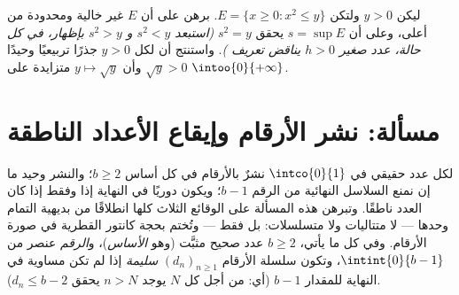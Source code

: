 \begin{exercise}[$\star\star\star$]\label{exo:b1:reals:12}
ليكن $y > 0$ ولتكن $E = \{x \geq 0 : x^2 \leq y\}$. برهن على أن $E$
غير خالية ومحدودة من أعلى، وعلى أن $s = \sup E$ يحقق $s^2 =
y$ \emph{(استبعد $s^2 < y$ و $s^2 > y$ بإظهار، في كل
حالة، عدد صغير $h > 0$ يناقض تعريف
)}. واستنتج أن لكل $y > 0$ جذرًا تربيعيًا وحيدًا
$\sqrt y > 0$ وأن $y \mapsto \sqrt y$ متزايدة على
$\intoo{0}{+\infty}$.
\end{exercise}

\section{مسألة: نشر الأرقام وإيقاع الأعداد الناطقة}

\begin{problem}
\label{pb:b1:reals:1}
لكل عدد حقيقي في $\intco{0}{1}$ نشرٌ بالأرقام في كل أساس
$b \geq 2$؛ والنشر وحيد ما إن نمنع السلاسل النهائية من
الرقم $b - 1$؛ ويكون دوريًا في النهاية إذا وفقط إذا كان
العدد ناطقًا. وتبرهن هذه المسألة على الوقائع الثلاث كلها
انطلاقًا من بديهية التمام وحدها --- لا متتاليات ولا متسلسلات:
بل    فقط
--- وتُختم بحجة كانتور القطرية في صورة الأرقام.
وفي كل ما يأتي، $b \geq 2$ عدد صحيح مثبَّت (وهو \emph{الأساس})،
و\emph{الرقم} عنصر من $\intint{0}{b-1}$، وتكون سلسلة
الأرقام $(d_n)_{n \geq 1}$ \emph{سليمة} إذا لم تكن
مساوية في النهاية للمقدار $b - 1$ (أي: من أجل كل $N$ يوجد $n >
N$ يحقق $d_n \leq b - 2$).


\end{problem}
